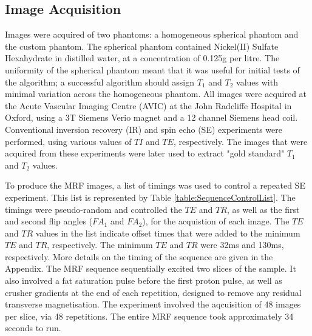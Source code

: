 \documentclass[journal]{IEEEtran}
\begin{document}
\subsection{Image Acquisition}
 Images were acquired of two phantoms: a homogeneous spherical phantom and the custom phantom. 
The spherical phantom contained Nickel(II) Sulfate Hexahydrate in distilled water, at a concentration of 0.125g per litre. The uniformity of the spherical phantom meant that it was useful for initial tests of the algorithm; a successful algorithm should assign $T_1$ and $T_2$ values with minimal variation across the homogeneous phantom. All images were acquired at the Acute Vascular Imaging Centre (AVIC) at the John Radcliffe Hospital in Oxford, using a 3T Siemens Verio magnet and a 12 channel Siemens head coil. 
Conventional inversion recovery (IR) and spin echo (SE) experiments were performed, using various values of $TI$ and $TE$, respectively. The images that were acquired from these experiments were later used to extract "gold standard" $T_1$ and $T_2$ values.

To produce the MRF images, a list of timings was used to control a repeated SE experiment. This list is represented by Table \ref{table:SequenceControlList}. The timings were pseudo-random and controlled the $TE$ and $TR$, as well as the first and second flip angles ($FA_1$ and $FA_2$), for the acquistion of each image. The $TE$ and $TR$ values in the list indicate offset times that were added to the minimum $TE$ and $TR$, respectively. The minimum $TE$ and $TR$ were 32ms and 130ms, respectively. More details on the timing of the sequence are given in the Appendix. The MRF sequence sequentially excited two slices of the sample. It also involved a fat saturation pulse before the first proton pulse, as well as crusher gradients at the end of each repetition, designed to remove any residual transverse magnetisation. The experiment involved the aqcuisition of 48 images per slice, via 48 repetitions. 
The entire MRF sequence took approximately 34 seconds to run.


\end{document}
